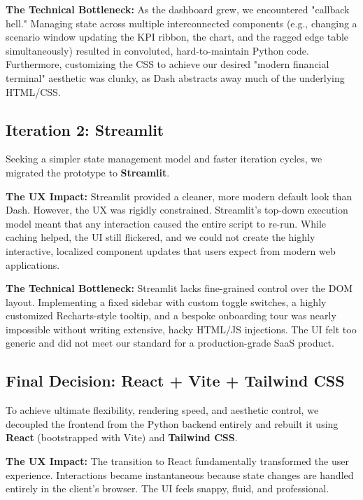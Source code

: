 \documentclass[12pt]{article}
\begin{document}
\textbf{The Technical Bottleneck:} As the dashboard grew, we encountered "callback hell." Managing state across multiple interconnected components (e.g., changing a scenario window updating the KPI ribbon, the chart, and the ragged edge table simultaneously) resulted in convoluted, hard-to-maintain Python code. Furthermore, customizing the CSS to achieve our desired "modern financial terminal" aesthetic was clunky, as Dash abstracts away much of the underlying HTML/CSS.

\subsection{Iteration 2: Streamlit}
Seeking a simpler state management model and faster iteration cycles, we migrated the prototype to \textbf{Streamlit}.

\textbf{The UX Impact:} Streamlit provided a cleaner, more modern default look than Dash. However, the UX was rigidly constrained. Streamlit's top-down execution model meant that any interaction caused the entire script to re-run. While caching helped, the UI still flickered, and we could not create the highly interactive, localized component updates that users expect from modern web applications.

\textbf{The Technical Bottleneck:} Streamlit lacks fine-grained control over the DOM layout. Implementing a fixed sidebar with custom toggle switches, a highly customized Recharts-style tooltip, and a bespoke onboarding tour was nearly impossible without writing extensive, hacky HTML/JS injections. The UI felt too generic and did not meet our standard for a production-grade SaaS product.

\subsection{Final Decision: React + Vite + Tailwind CSS}
To achieve ultimate flexibility, rendering speed, and aesthetic control, we decoupled the frontend from the Python backend entirely and rebuilt it using \textbf{React} (bootstrapped with Vite) and \textbf{Tailwind CSS}.

\textbf{The UX Impact:} The transition to React fundamentally transformed the user experience. Interactions became instantaneous because state changes are handled entirely in the client's browser. The UI feels snappy, fluid, and professional.
\end{document}
